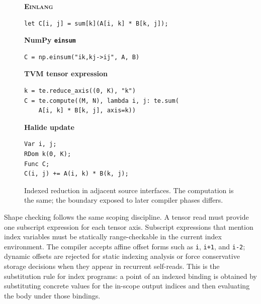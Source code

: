 \documentclass[sigplan,screen,nonacm]{acmart}
\newcommand{\einlang}{\textsc{Einlang}}
\begin{document}
\begin{figure}[t]
\centering
\begin{minipage}[t]{0.98\linewidth}
\textbf{\einlang{}}
\begin{lstlisting}[style=einlang]
let C[i, j] = sum[k](A[i, k] * B[k, j]);
\end{lstlisting}
\end{minipage}

\vspace{0.25\baselineskip}
\begin{minipage}[t]{0.98\linewidth}
\textbf{NumPy \texttt{einsum}}
\begin{lstlisting}[style=pythoncode]
C = np.einsum("ik,kj->ij", A, B)
\end{lstlisting}
\end{minipage}

\vspace{0.25\baselineskip}
\begin{minipage}[t]{0.98\linewidth}
\textbf{TVM tensor expression}
\begin{lstlisting}[style=pythoncode]
k = te.reduce_axis((0, K), "k")
C = te.compute((M, N), lambda i, j: te.sum(
    A[i, k] * B[k, j], axis=k))
\end{lstlisting}
\end{minipage}

\vspace{0.25\baselineskip}
\begin{minipage}[t]{0.98\linewidth}
\textbf{Halide update}
\begin{lstlisting}[style=pythoncode]
Var i, j;
RDom k(0, K);
Func C;
C(i, j) += A(i, k) * B(k, j);
\end{lstlisting}
\end{minipage}
\caption{Indexed reduction in adjacent source interfaces. The computation is the same; the boundary exposed to later compiler phases differs.}
\label{fig:index-code-comparison}
\end{figure}

Shape checking follows the same scoping discipline. A tensor read must provide one subscript expression for each tensor axis. Subscript expressions that mention index variables must be statically range-checkable in the current index environment. The compiler accepts affine offset forms such as \texttt{i}, \texttt{i+1}, and \texttt{i-2}; dynamic offsets are rejected for static indexing analysis or force conservative storage decisions when they appear in recurrent self-reads. This is the substitution rule for index programs: a point of an indexed binding is obtained by substituting concrete values for the in-scope output indices and then evaluating the body under those bindings.
\end{document}
